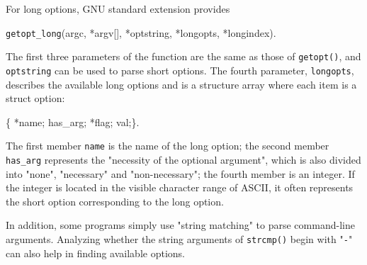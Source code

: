 For long options, GNU standard extension provides
\iffalse
\begin{lstlisting}[numbers=none]
int getopt_long(int argc, char * const argv[],
                const char *optstring,
                const struct option *longopts,
                int *longindex);
\end{lstlisting}
\else
\texttt{getopt\_long}(argc, *argv[], *optstring, *longopts, *longindex).
\fi
The first three parameters of the function are the same as those of \texttt{getopt()}, and \texttt{optstring} can be used to parse short options.
The fourth parameter, \texttt{longopts}, describes the available long options and is a structure array where each item is a struct option:
\iffalse
\begin{lstlisting}[numbers=none]
struct option {
    const char *name;
    int         has_arg;
    int        *flag;
    int         val;
};
\end{lstlisting}
\else
\{ *name; has\_arg; *flag; val;\}.
\fi
The first member \texttt{name} is the name of the long option; the second member \texttt{has\_arg} represents the "necessity of the optional argument", which is also divided into "none", "necessary" and "non-necessary"; the fourth member is an integer. If the integer is located in the visible character range of ASCII, it often represents the short option corresponding to the long option.

In addition, some programs simply use "string matching" to parse command-line arguments. Analyzing whether the string arguments of \texttt{strcmp()} begin with "\texttt{-}" can also help in finding available options.


